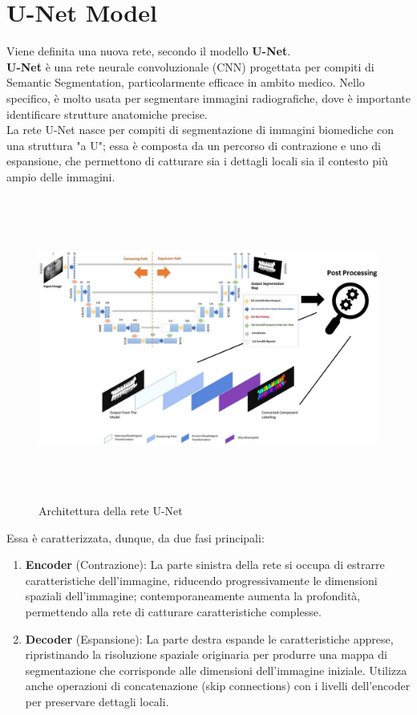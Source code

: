 \documentclass[12pt,a4paper,openright,twoside]{book}
\begin{document}
\section{U-Net Model}
Viene definita una nuova rete, secondo il modello \textbf{U-Net}.\\
\textbf{U-Net} è una rete neurale convoluzionale (CNN) progettata per compiti di Semantic Segmentation, particolarmente efficace in ambito medico. Nello specifico, è molto usata per segmentare immagini radiografiche, dove è importante identificare strutture anatomiche precise. \\
La rete U-Net nasce per compiti di segmentazione di immagini biomediche con una struttura "a U"; essa è composta da un percorso di contrazione e uno di espansione, che permettono di catturare sia i dettagli locali sia il contesto più ampio delle immagini.
\begin{figure}[H]
	\hspace{-2cm}
	\includegraphics[height=10cm,width=18cm]{figures/ArchitectureUnet.pdf}
    	\caption{Architettura della rete U-Net}
	\label{fig:unet}
\end{figure}
Essa è caratterizzata, dunque, da due fasi principali:
\begin{enumerate}
\item \textbf{Encoder} (Contrazione): La parte sinistra della rete si occupa di estrarre caratteristiche dell’immagine, riducendo progressivamente le dimensioni spaziali dell’immagine; contemporaneamente aumenta la profondità, permettendo alla rete di catturare caratteristiche complesse.
\item \textbf{Decoder} (Espansione): La parte destra espande le caratteristiche apprese, ripristinando la risoluzione spaziale originaria per produrre una mappa di segmentazione che corrisponde alle dimensioni dell’immagine iniziale. Utilizza anche operazioni di concatenazione (skip connections) con i livelli dell'encoder per preservare dettagli locali.
\end{enumerate}
\end{document}
